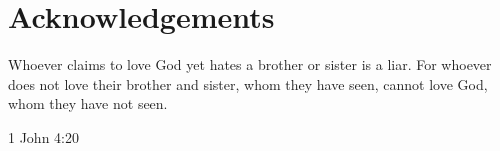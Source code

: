 \chapter{Acknowledgements}
\label{ch:ack}
\epigraph{Whoever claims to love God yet hates a brother or sister is a liar.
  For whoever does not love their brother and sister, whom they have seen,
cannot love God, whom they have not seen.}{
1 John 4:20}
\lipsum[1]
